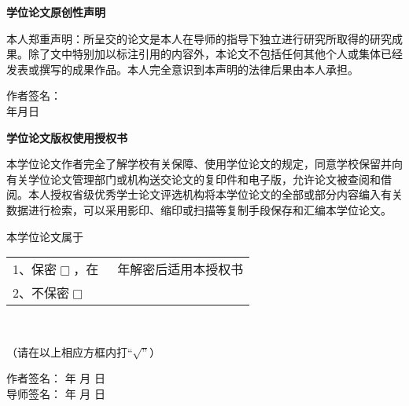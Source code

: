 \begin{center}
 \textbf{学位论文原创性声明}
\end{center}

本人郑重声明：所呈交的论文是本人在导师的指导下独立进行研究所取得的研究成果。除了文中特别加以标注引用的内容外，本论文不包括任何其他个人或集体已经发表或撰写的成果作品。本人完全意识到本声明的法律后果由本人承担。 
\begin{flushright}
 作者签名：\qquad ~~~\\

年\qquad 月\qquad 日
\end{flushright}
\vskip 2cm
\begin{center}
 \textbf{学位论文版权使用授权书}
\end{center}

本学位论文作者完全了解学校有关保障、使用学位论文的规定，同意学校保留并向有关学位论文管理部门或机构送交论文的复印件和电子版，允许论文被查阅和借阅。本人授权省级优秀学士论文评选机构将本学位论文的全部或部分内容编入有关数据进行检索，可以采用影印、缩印或扫描等复制手段保存和汇编本学位论文。\smallskip

本学位论文属于
\begin{tabular}[t]{l}
1、保密$ \Box$，在~~~年解密后适用本授权书  \\ 
2、不保密$ \Box$  \\ 
\end{tabular} \\
\begin{center}
（请在以上相应方框内打“$\surd”$）
\end{center}
\begin{flushright}
 作者签名：  \quad\quad\quad\quad 年 \quad  月  \quad  日\\
导师签名：   \quad\quad\quad\quad 年 \quad  月 \quad   日\\
\end{flushright}
\thispagestyle{empty}
\clearpage